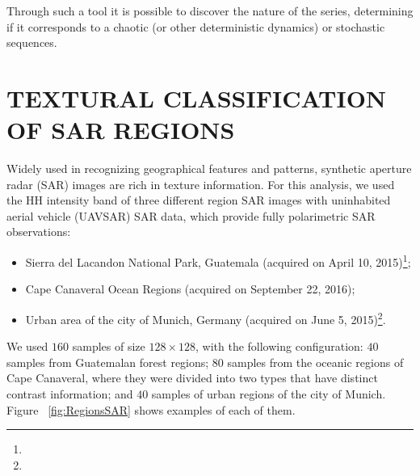 \documentclass{isprs}
\begin{document}
	Through such a tool it is possible to discover the nature of the series, determining if it corresponds to a chaotic (or other deterministic dynamics) or stochastic sequences.
	
	\section{TEXTURAL CLASSIFICATION OF SAR REGIONS}\label{SAR}
	
	Widely used in recognizing geographical features and patterns, synthetic aperture radar (SAR) images are rich in texture information.
	For this analysis, we used the HH intensity band of three different region SAR images with uninhabited aerial vehicle (UAVSAR) SAR data, which provide fully polarimetric SAR observations:
	\begin{itemize}
		\item Sierra del Lacandon National Park, Guatemala (acquired on April 10, 2015)\footnote{};
		\item Cape Canaveral Ocean Regions (acquired on September 22, 2016);
		\item Urban area of the city of Munich, Germany (acquired on June 5, 2015)\footnote{}.
	\end{itemize}
	
	We used $160$ samples of size $128\times128$, with the following configuration:
	$40$ samples from Guatemalan forest regions;
	$80$ samples from the oceanic regions of Cape Canaveral, where they were divided into two types that have distinct contrast information; and
	$40$ samples of urban regions of the city of Munich.
	Figure ~\ref{fig:RegionsSAR} shows examples of each of them.
	
\end{document}
